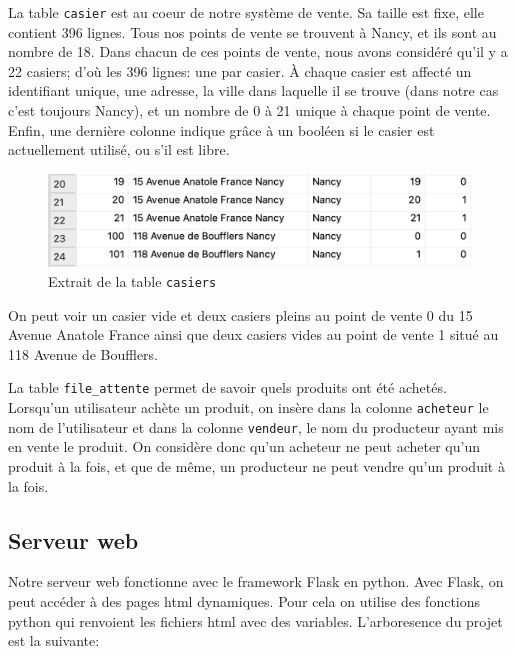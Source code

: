 \documentclass[11pt]{article}
\begin{document}
La table \texttt{casier} est au coeur de notre système de vente. Sa taille est fixe, elle contient 396 lignes. Tous nos points de vente se trouvent à Nancy, et ils sont au nombre de 18. Dans chacun de ces points de vente, nous avons considéré qu'il y a 22 casiers; d'où les 396 lignes: une par casier. À chaque casier est affecté un identifiant unique, une adresse, la ville dans laquelle il se trouve (dans notre cas c'est toujours Nancy), et un nombre de 0 à 21 unique à chaque point de vente. Enfin, une dernière colonne indique grâce à un booléen si le casier est actuellement utilisé, ou s'il est libre.

\begin{figure}[h]
	\centering
	\includegraphics[scale=0.6]{CasierBDExemple.png}
	\caption{Extrait de la table \texttt{casiers}}
\end{figure}
On peut voir un casier vide et deux casiers pleins au point de vente 0 du 15 Avenue Anatole France ainsi que deux casiers vides au point de vente 1 situé au 118 Avenue de Boufflers.
\vspace{0.4cm}

La table \texttt{file\_attente} permet de savoir quels produits ont été achetés. Lorsqu'un utilisateur achète un produit, on insère dans la colonne \texttt{acheteur} le nom de l'utilisateur et dans la colonne \texttt{vendeur}, le nom du producteur ayant mis en vente le produit. On considère donc qu'un acheteur ne peut acheter qu'un produit à la fois, et que de même, un producteur ne peut vendre qu'un produit à la fois.


\subsection{Serveur web}
Notre serveur web fonctionne avec le framework Flask en python. Avec Flask, on peut accéder à des pages html dynamiques. Pour cela on utilise des fonctions python qui renvoient les fichiers html avec des variables. L’arboresence du projet est la suivante:
\vspace{0.4cm}
\end{document}
